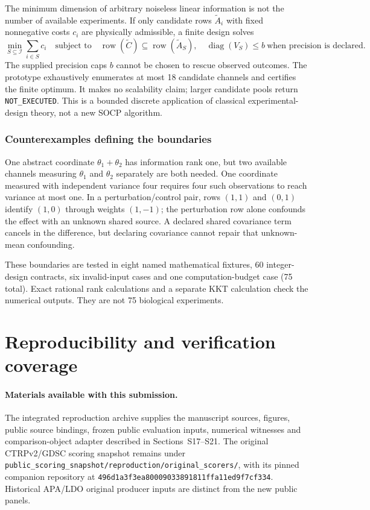 \documentclass[11pt]{article}
\begin{document}
The minimum dimension of arbitrary noiseless linear information is not the number of available experiments. If only candidate rows $\widetilde A_i$ with fixed nonnegative costs $c_i$ are physically admissible, a finite design solves
\[
\min_{S\subseteq\mathcal I}\sum_{i\in S}c_i
\quad\text{subject to}\quad
\operatorname{row}(\widetilde C)\subseteq\operatorname{row}(\widetilde A_S),
\quad \operatorname{diag}(V_S)\leq b\ \text{when precision is declared}.
\]
The supplied precision caps $b$ cannot be chosen to rescue observed outcomes. The prototype exhaustively enumerates at most 18 candidate channels and certifies the finite optimum. It makes no scalability claim; larger candidate pools return \texttt{NOT\_EXECUTED}. This is a bounded discrete application of classical experimental-design theory, not a new SOCP algorithm.

\subsubsection{Counterexamples defining the boundaries}
One abstract coordinate $\theta_1+\theta_2$ has information rank one, but two available channels measuring $\theta_1$ and $\theta_2$ separately are both needed. One coordinate measured with independent variance four requires four such observations to reach variance at most one. In a perturbation/control pair, rows $(1,1)$ and $(0,1)$ identify $(1,0)$ through weights $(1,-1)$; the perturbation row alone confounds the effect with an unknown shared source. A declared shared covariance term cancels in the difference, but declaring covariance cannot repair that unknown-mean confounding.

These boundaries are tested in eight named mathematical fixtures, 60 integer-design contracts, six invalid-input cases and one computation-budget case (75 total). Exact rational rank calculations and a separate KKT calculation check the numerical outputs. They are not 75 biological experiments.




\section{Reproducibility and verification coverage}
\paragraph{Materials available with this submission.}
The integrated reproduction archive supplies the manuscript sources, figures, public source bindings, frozen public evaluation inputs, numerical witnesses and comparison-object adapter described in Sections~S17--S21. The original CTRPv2/GDSC scoring snapshot remains under \nolinkurl{public_scoring_snapshot/reproduction/original_scorers/}, with its pinned companion repository at \nolinkurl{496d1a3f3ea80009033891811ffa11ed9f7cf334}. Historical APA/LDO original producer inputs are distinct from the new public panels.
\end{document}

